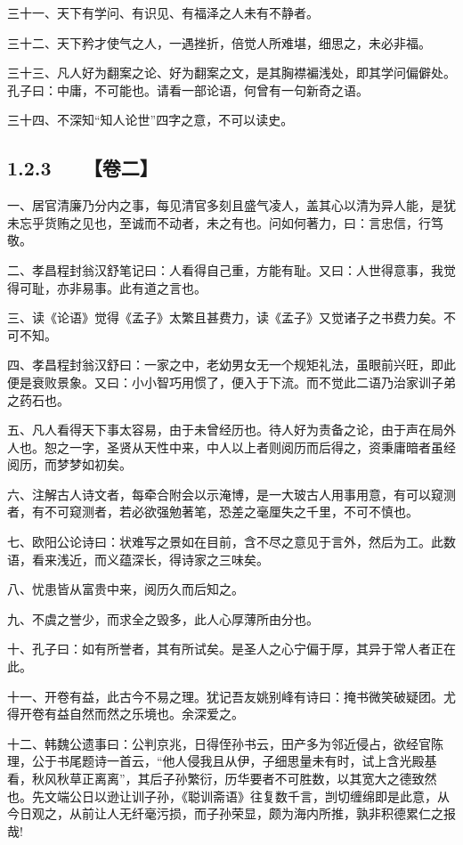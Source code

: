 \documentclass[letterpaper,10pt,english]{sphinxmanual}
\begin{document}
三十一、天下有学问、有识见、有福泽之人未有不静者。

三十二、天下矜才使气之人，一遇挫折，倍觉人所难堪，细思之，未必非福。

三十三、凡人好为翻案之论、好为翻案之文，是其胸襟褊浅处，即其学问偏僻处。孔子曰：中庸，不可能也。请看一部论语，何曾有一句新奇之语。

三十四、不深知“知人论世”四字之意，不可以读史。


\subsection{1.2.3   【卷二】}
\label{\detokenize{p00_u5176_u5b83/_u300a_u5f20_u82f1-_u806a_u8bad_u658b_u8bed_u300b_u300a_u5f20_u5ef7_u7389-_u6f84_u6000_u56ed_u8bed_u300b_u5408_u8f91:id10}}
一、居官清廉乃分内之事，每见清官多刻且盛气凌人，盖其心以清为异人能，是犹未忘乎货贿之见也，至诚而不动者，未之有也。问如何著力，曰：言忠信，行笃敬。

二、孝昌程封翁汉舒笔记曰：人看得自己重，方能有耻。又曰：人世得意事，我觉得可耻，亦非易事。此有道之言也。

三、读《论语》觉得《孟子》太繁且甚费力，读《孟子》又觉诸子之书费力矣。不可不知。

四、孝昌程封翁汉舒曰：一家之中，老幼男女无一个规矩礼法，虽眼前兴旺，即此便是衰败景象。又曰：小小智巧用惯了，便入于下流。而不觉此二语乃治家训子弟之药石也。

五、凡人看得天下事太容易，由于未曾经历也。待人好为责备之论，由于声在局外人也。恕之一字，圣贤从天性中来，中人以上者则阅历而后得之，资秉庸暗者虽经阅历，而梦梦如初矣。

六、注解古人诗文者，每牵合附会以示淹博，是一大玻古人用事用意，有可以窥测者，有不可窥测者，若必欲强勉著笔，恐差之毫厘失之千里，不可不慎也。

七、欧阳公论诗曰：状难写之景如在目前，含不尽之意见于言外，然后为工。此数语，看来浅近，而义蕴深长，得诗家之三味矣。

八、忧患皆从富贵中来，阅历久而后知之。

九、不虞之誉少，而求全之毁多，此人心厚薄所由分也。

十、孔子曰：如有所誉者，其有所试矣。是圣人之心宁偏于厚，其异于常人者正在此。

十一、开卷有益，此古今不易之理。犹记吾友姚别峰有诗曰：掩书微笑破疑团。尤得开卷有益自然而然之乐境也。余深爱之。

十二、韩魏公遗事曰：公判京兆，日得侄孙书云，田产多为邻近侵占，欲经官陈理，公于书尾题诗一首云，“他人侵我且从伊，子细思量未有时，试上含光殿基看，秋风秋草正离离”，其后子孙繁衍，历华要者不可胜数，以其宽大之德致然也。先文端公日以逊让训子孙，《聪训斋语》往复数千言，剀切缠绵即是此意，从今日观之，从前让人无纤毫污损，而子孙荣显，颇为海内所推，孰非积德累仁之报哉!
\end{document}
